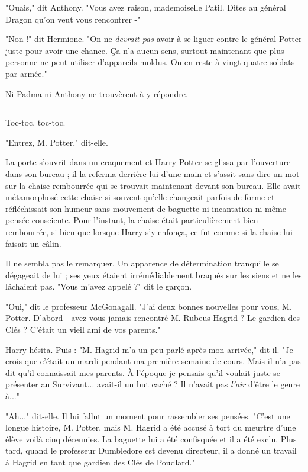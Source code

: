 "Ouais," dit Anthony. "Vous avez raison, mademoiselle Patil. Dites au général Dragon qu'on veut vous rencontrer -"

"Non !" dit Hermione. "On ne \emph{devrait pas}  avoir à se liguer contre le général Potter juste pour avoir une chance. Ça n'a aucun sens, surtout maintenant que plus personne ne peut utiliser d'appareils moldus. On en reste à vingt-quatre soldats par armée."

Ni Padma ni Anthony ne trouvèrent à y répondre.
\par\noindent\rule{\textwidth}{0.4pt}
Toc-toc, toc-toc.

"Entrez, M. Potter," dit-elle.

La porte s'ouvrit dans un craquement et Harry Potter se glissa par l'ouverture dans son bureau ; il la referma derrière lui d'une main et s'assit sans dire un mot sur la chaise rembourrée qui se trouvait maintenant devant son bureau. Elle avait métamorphosé cette chaise si souvent qu'elle changeait parfois de forme et réfléchissait son humeur sans mouvement de baguette ni incantation ni même pensée consciente. Pour l'instant, la chaise était particulièrement bien rembourrée, si bien que lorsque Harry s'y enfonça, ce fut comme si la chaise lui faisait un câlin.

Il ne sembla pas le remarquer. Un apparence de détermination tranquille se dégageait de lui ; ses yeux étaient irrémédiablement braqués sur les siens et ne les lâchaient pas. "Vous m'avez appelé ?" dit le garçon.

"Oui," dit le professeur McGonagall. "J'ai deux bonnes nouvelles pour vous, M. Potter. D'abord - avez-vous jamais rencontré M. Rubeus Hagrid ? Le gardien des Clés ? C'était un vieil ami de vos parents."

Harry hésita. Puis : "M. Hagrid m'a un peu parlé après mon arrivée," dit-il. "Je crois que c'était un mardi pendant ma première semaine de cours. Mais il n'a pas dit qu'il connaissait mes parents. À l'époque je pensais qu'il voulait juste se présenter au Survivant... avait-il un but caché ? Il n'avait pas \emph{l'air}  d'être le genre à..."

"Ah..." dit-elle. Il lui fallut un moment pour rassembler ses pensées. "C'est une longue histoire, M. Potter, mais M. Hagrid a été accusé à tort du meurtre d'une élève voilà cinq décennies. La baguette lui a été confisquée et il a été exclu. Plus tard, quand le professeur Dumbledore est devenu directeur, il a donné un travail à Hagrid en tant que gardien des Clés de Poudlard."

